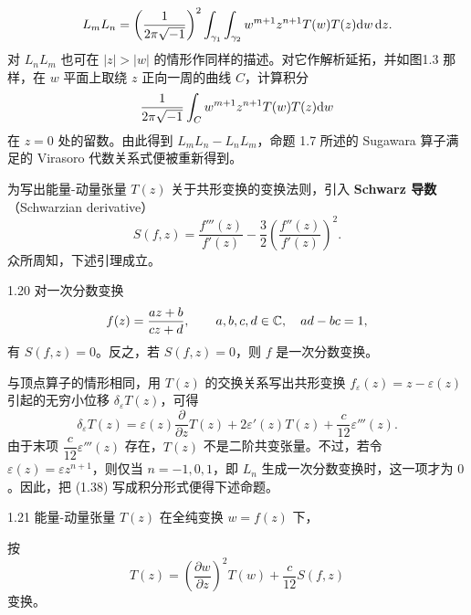 
\[
L_mL_n=\left(\frac{1}{2\pi\sqrt{-1}}\right)^{2}\int_{\gamma_1}\int_{\gamma_2}w^{m+1}z^{n+1}T(w)T(z)\mathrm{d} w\,\mathrm{d} z .
\]
对 $L_nL_m$ 也可在 $|z|>|w|$ 的情形作同样的描述。对它作解析延拓，并如图1.3 那样，在 $w$ 平面上取绕 $z$ 正向一周的曲线 $C$，计算积分
\[
\frac{1}{2\pi\sqrt{-1}}\int_{C}w^{m+1}z^{n+1}T(w)T(z)\mathrm{d} w
\]
在 $z=0$ 处的留数。由此得到 $L_mL_n-L_nL_m$，命题 1.7 所述的 Sugawara 算子满足的 Virasoro 代数关系式便被重新得到。

为写出能量-动量张量 $T(z)$ 关于共形变换的变换法则，引入 \textbf{Schwarz 导数}（Schwarzian derivative）
\begin{equation}
  S(f,z)=\frac{f'''(z)}{f'(z)}-\frac{3}{2}\left(\frac{f''(z)}{f'(z)}\right)^{2}. \tag{1.37}
\end{equation}
众所周知，下述引理成立。

\begin{lemma}{1.20}
  对一次分数变换
  \[
  f(z)=\frac{az+b}{cz+d},\qquad a,b,c,d\in\mathbb{C},\quad ad-bc=1,
  \]
  有 $S(f,z)=0$。反之，若 $S(f,z)=0$，则 $f$ 是一次分数变换。
\end{lemma}


与顶点算子的情形相同，用 $T(z)$ 的交换关系写出共形变换 $f_\varepsilon(z)=z-\varepsilon(z)$ 引起的无穷小位移 $\delta_\varepsilon T(z)$，可得
\begin{equation}
  \delta_\varepsilon T(z)=\varepsilon(z)\frac{\partial}{\partial z}T(z)+2\varepsilon'(z)T(z)+\frac{c}{12}\varepsilon'''(z). \tag{1.38}
\end{equation}
由于末项 $\dfrac{c}{12}\varepsilon'''(z)$ 存在，$T(z)$ 不是二阶共变张量。不过，若令 $\varepsilon(z)=\varepsilon z^{n+1}$，则仅当 $n=-1,0,1$，即 $L_n$ 生成一次分数变换时，这一项才为 $0$。因此，把 (1.38) 写成积分形式便得下述命题。

\begin{proposition}{1.21}
  能量-动量张量 $T(z)$ 在全纯变换 $w=f(z)$ 下，


  按
  \[
  T(z)=\left(\frac{\partial w}{\partial z}\right)^{2}T(w)+\frac{c}{12}S(f,z)
  \]
  变换。
\end{proposition}


